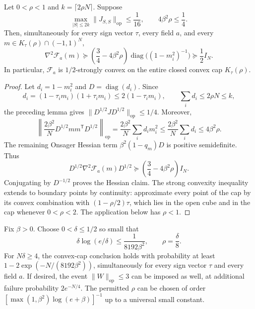 \documentclass[11pt,reqno]{amsart}
\newcommand{\op}{\operatorname{op}}
\begin{document}
\begin{prop}
Let $0<\rho<1$ and $k=\lceil2\rho N\rceil$. Suppose
\[
 \max_{|S|\le2k}\|J_{S,S}\|_{\op}\le\frac1{16},
 \qquad 4\beta^2\rho\le\frac14.
\]
Then, simultaneously for every sign vector $\tau$, every field $a$, and
every $m\in K_\tau(\rho)\cap(-1,1)^N$,
\[
 \nabla^2\mathcal F_a(m)
   \succeq\left(\frac34-4\beta^2\rho\right)
                   \operatorname{diag}\bigl((1-m_i^2)^{-1}\bigr)
   \succeq\frac12 I_N.
\]
In particular, $\mathcal F_a$ is $1/2$-strongly convex on the entire
closed convex cap $K_\tau(\rho)$.
\end{prop}

\begin{proof}
Let $d_i=1-m_i^2$ and $D=\operatorname{diag}(d_i)$. Since
\[
 d_i=(1-\tau_i m_i)(1+\tau_i m_i)
       \le2(1-\tau_i m_i),
 \qquad \sum_i d_i\le2\rho N\le k,
\]
the preceding lemma gives
$\|D^{1/2}JD^{1/2}\|_{\op}\le1/4$. Moreover,
\[
 \left\|\frac{2\beta^2}{N}
    D^{1/2}mm^{\mathsf T}D^{1/2}\right\|_{\op}
 =\frac{2\beta^2}{N}\sum_i d_i m_i^2
 \le\frac{2\beta^2}{N}\sum_i d_i\le4\beta^2\rho.
\]
The remaining Onsager Hessian term $\beta^2(1-q_m)D$ is positive
semidefinite. Thus
\[
 D^{1/2}\nabla^2\mathcal F_a(m)D^{1/2}
       \succeq\left(\frac34-4\beta^2\rho\right)I_N.
\]
Conjugating by $D^{-1/2}$ proves the Hessian claim. The strong convexity
inequality extends to boundary points by continuity: approximate every
point of the cap by its convex combination with
$(1-\rho/2)\tau$, which lies in the open cube and in the cap whenever
$0<\rho<2$. The application below has $\rho<1$.
\end{proof}

\begin{cor}
Fix $\beta>0$. Choose $0<\delta\le1/2$ so small that
\[
 \delta\log(e/\delta)\le\frac1{8192\beta^2},
 \qquad \rho=\frac\delta8.
\]
For $N\delta\ge4$, the convex-cap conclusion holds with probability at
least $1-2\exp(-N/(8192\beta^2))$, simultaneously for every sign vector
$\tau$ and every field $a$. If desired, the event $\|W\|_{\op}\le3$ can
be imposed as well, at additional failure probability $2e^{-N/4}$.
The permitted $\rho$ can be chosen of order
$[\max(1,\beta^2)\log(e+\beta)]^{-1}$ up to a universal small constant.
\end{cor}
\end{document}
